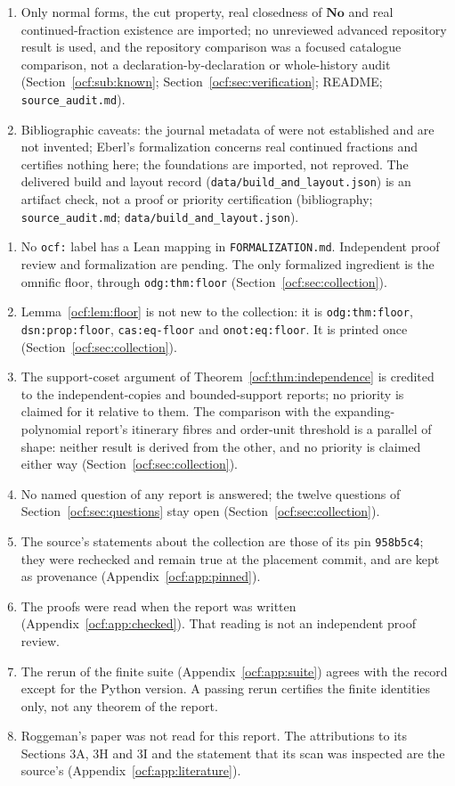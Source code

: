 \documentclass[11pt,a4paper]{article}
\numberwithin{equation}{section}
\theoremstyle{definition}
\theoremstyle{remark}
\newcommand{\No}{\mathbf{No}}
\newcommand{\rpath}[1]{\nolinkurl{#1}}%
\newcommand{\lbl}[1]{\nolinkurl{#1}}%
\begin{document}
\begin{enumerate}[label=S\arabic*.,leftmargin=2.6em,itemsep=2pt]
\item Only normal forms, the cut property, real closedness of $\No$ and real
continued-fraction existence are imported; no unreviewed advanced
repository result is used, and the repository comparison was a focused
catalogue comparison, not a declaration-by-declaration or whole-history
audit (Section~\ref{ocf:sub:known}; Section~\ref{ocf:sec:verification};
README; \rpath{source\_audit.md}).
\item Bibliographic caveats: the journal metadata of \cite{Roggeman} were
not established and are not invented; Eberl's formalization \cite{Eberl}
concerns real continued fractions and certifies nothing here; the
foundations \cite{Conway,Gonshor} are imported, not reproved. The delivered
build and layout record (\rpath{data/build\_and\_layout.json}) is an
artifact check, not a proof or priority certification (bibliography;
\rpath{source\_audit.md}; \rpath{data/build\_and\_layout.json}).
\end{enumerate}
\begin{enumerate}[label=W\arabic*.,leftmargin=2.6em,itemsep=2pt]
\item No \texttt{ocf:} label has a Lean mapping in \rpath{FORMALIZATION.md}.
Independent proof review and formalization are pending. The only
formalized ingredient is the omnific floor, through \lbl{odg:thm:floor}
(Section~\ref{ocf:sec:collection}).
\item Lemma~\ref{ocf:lem:floor} is not new to the collection: it is
\lbl{odg:thm:floor}, \lbl{dsn:prop:floor}, \lbl{cas:eq-floor} and
\lbl{onot:eq:floor}. It is printed once (Section~\ref{ocf:sec:collection}).
\item The support-coset argument of Theorem~\ref{ocf:thm:independence} is
credited to the independent-copies and bounded-support reports; no
priority is claimed for it relative to them. The comparison with the
expanding-polynomial report's itinerary fibres and order-unit threshold is
a parallel of shape: neither result is derived from the other, and no
priority is claimed either way (Section~\ref{ocf:sec:collection}).
\item No named question of any report is answered; the twelve questions of
Section~\ref{ocf:sec:questions} stay open (Section~\ref{ocf:sec:collection}).
\item The source's statements about the collection are those of its pin
\texttt{958b5c4}; they were rechecked and remain true at the placement
commit, and are kept as provenance (Appendix~\ref{ocf:app:pinned}).
\item The proofs were read when the report was written
(Appendix~\ref{ocf:app:checked}). That reading is not an independent proof
review.
\item The rerun of the finite suite (Appendix~\ref{ocf:app:suite}) agrees
with the record except for the Python version. A passing rerun certifies
the finite identities only, not any theorem of the report.
\item Roggeman's paper was not read for this report. The attributions to
its Sections 3A, 3H and 3I and the statement that its scan was inspected
are the source's (Appendix~\ref{ocf:app:literature}).
\end{enumerate}
\end{document}
